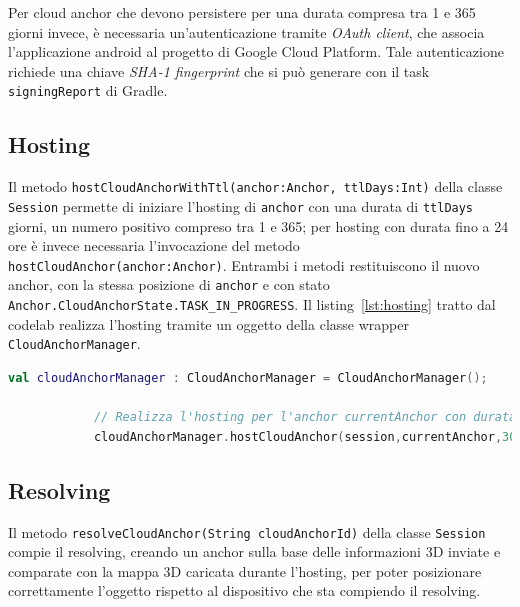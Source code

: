 \documentclass[crop=false, class=book]{standalone}
\begin{document}
	\noindent
	Per cloud anchor che devono persistere per una durata compresa tra 1 e 365 giorni invece, è necessaria un'autenticazione tramite \textit{OAuth client}, che associa l'applicazione android al progetto di Google Cloud Platform. Tale autenticazione richiede una chiave \textit{SHA-1 fingerprint} che si può generare con il task \verb|signingReport| di Gradle.
	
	\subsection*{Hosting}
	Il metodo \verb|hostCloudAnchorWithTtl(anchor:Anchor, ttlDays:Int)| della classe \verb|Session| permette di iniziare l'hosting di \verb|anchor| con una durata di \verb|ttlDays| giorni, un numero positivo compreso tra 1 e 365; per hosting con durata fino a 24 ore è invece necessaria l'invocazione del metodo \verb|hostCloudAnchor(anchor:Anchor)|. Entrambi i metodi restituiscono il nuovo anchor, con la stessa posizione di \verb|anchor| e con stato \verb|Anchor.CloudAnchorState.TASK_IN_PROGRESS|. Il listing~\vref{lst:hosting} tratto dal codelab \cite{codelab2021cloud} realizza l'hosting tramite un oggetto della classe wrapper \verb|CloudAnchorManager|.
	
	\begin{center}
		\begin{minipage}{0.95\textwidth}
			\begin{lstlisting}[caption={Hosting di un cloud anchor.}, label={lst:hosting}, language=Kotlin]
			val cloudAnchorManager : CloudAnchorManager = CloudAnchorManager();
				
			// Realizza l'hosting per l'anchor currentAnchor con durata 300 giorni
			cloudAnchorManager.hostCloudAnchor(session,currentAnchor,300,this::onHostedAnchorAvailable);
			\end{lstlisting}
		\end{minipage}
	\end{center}
	
	\subsection*{Resolving}
	Il metodo \verb|resolveCloudAnchor(String cloudAnchorId)| della classe \verb|Session| compie il resolving, creando un anchor sulla base delle informazioni 3D inviate e comparate con la mappa 3D caricata durante l'hosting, per poter posizionare correttamente l'oggetto rispetto al dispositivo che sta compiendo il resolving.

	
\end{document}
